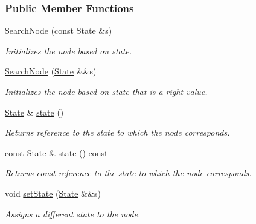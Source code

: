 \subsubsection*{Public Member Functions}
\begin{DoxyCompactItemize}
\item 
\hyperlink{structslb_1_1core_1_1sb_1_1SearchNode_a2bd821c0ee99d2683b8070997a0146af}{Search\+Node} (const \hyperlink{structslb_1_1core_1_1sb_1_1SearchNode_a1ddf004be6dc181034b39283698985ac}{State} \&s)
\begin{DoxyCompactList}\small\item\em Initializes the node based on state. \end{DoxyCompactList}\item 
\hyperlink{structslb_1_1core_1_1sb_1_1SearchNode_a1d79667de3a4b5530616ad3a0d056b3b}{Search\+Node} (\hyperlink{structslb_1_1core_1_1sb_1_1SearchNode_a1ddf004be6dc181034b39283698985ac}{State} \&\&s)
\begin{DoxyCompactList}\small\item\em Initializes the node based on state that is a right-\/value. \end{DoxyCompactList}\item 
\hyperlink{structslb_1_1core_1_1sb_1_1SearchNode_a1ddf004be6dc181034b39283698985ac}{State} \& \hyperlink{structslb_1_1core_1_1sb_1_1SearchNode_a5dfa3ce12a34a933f3214f2b1f8564ad}{state} ()
\begin{DoxyCompactList}\small\item\em Returns reference to the state to which the node corresponds. \end{DoxyCompactList}\item 
const \hyperlink{structslb_1_1core_1_1sb_1_1SearchNode_a1ddf004be6dc181034b39283698985ac}{State} \& \hyperlink{structslb_1_1core_1_1sb_1_1SearchNode_ac953581eb54cb60095283fc5aa391404}{state} () const 
\begin{DoxyCompactList}\small\item\em Returns const reference to the state to which the node corresponds. \end{DoxyCompactList}\item 
void \hyperlink{structslb_1_1core_1_1sb_1_1SearchNode_a652572c856bd30595912f421f46db33d}{set\+State} (\hyperlink{structslb_1_1core_1_1sb_1_1SearchNode_a1ddf004be6dc181034b39283698985ac}{State} \&\&s)
\begin{DoxyCompactList}\small\item\em Assigns a different state to the node. \end{DoxyCompactList}\item 

\end{DoxyCompactItemize}

